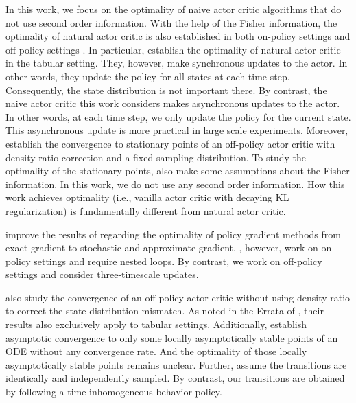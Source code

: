 \documentclass[twoside,11pt]{article}
\numberwithin{assucounter}{section}
\begin{document}
In this work,
we focus on the optimality of naive actor critic algorithms that do not use second order information.
With the help of the Fisher information,
the optimality of natural actor critic \citep{kakade2001natural,peters2008natural,bhatnagar2009natural} is also established in both on-policy settings \citep{agarwal2019optimality,wang2019neural,liu2020improved,khodadadian2021finitesample} and off-policy settings \citep{khodadadian2021finite,chen2021finitesample}.
In particular,
\citet{agarwal2019optimality,khodadadian2021finitesample,khodadadian2021finite} establish the optimality of natural actor critic in the tabular setting.
They, however, make synchronous updates to the actor.
In other words,
they update the policy for all states at each time step.
Consequently, the state distribution is not important there.
By contrast, 
the naive actor critic this work considers makes asynchronous updates to the actor.
In other words,
at each time step, 
we only update the policy for the current state.
This asynchronous update is more practical in large scale experiments. 
Moreover,
\citet{xu2021doubly} establish the convergence to stationary points of an off-policy actor critic with density ratio correction and a fixed sampling distribution.
To study the optimality of the stationary points,
\citet{xu2021doubly} also make some assumptions about the Fisher information.
In this work,
we do not use any second order information.
How this work achieves optimality (i.e., vanilla actor critic with decaying KL regularization) is fundamentally different from natural actor critic.

\citet{liu2020improved} improve the results of \citet{agarwal2019optimality} regarding the optimality of policy gradient methods from exact gradient to stochastic and approximate gradient.
\citet{liu2020improved},
however,
work on on-policy settings and require nested loops.
By contrast,
we work on off-policy settings and consider three-timescale updates.

\citet{degris2012off} also study the convergence of an off-policy actor critic without using density ratio to correct the state distribution mismatch.
As noted in the Errata of \citet{degris2012off},
their results also exclusively apply to tabular settings.
Additionally,
\citet{degris2012off} establish asymptotic convergence to only some locally asymptotically stable points of an ODE without any convergence rate. 
And the optimality of those locally asymptotically stable points remains unclear.
Further,
\citet{degris2012off} assume the transitions are identically and independently sampled.
By contrast,
our transitions are obtained by following a time-inhomogeneous behavior policy.
\end{document}

